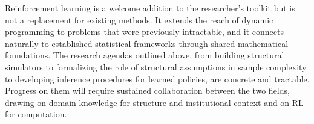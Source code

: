 Reinforcement learning is a welcome addition to the researcher's toolkit but is not a replacement for existing methods. It extends the reach of dynamic programming to problems that were previously intractable, and it connects naturally to established statistical frameworks through shared mathematical foundations. The research agendas outlined above, from building structural simulators to formalizing the role of structural assumptions in sample complexity to developing inference procedures for learned policies, are concrete and tractable. Progress on them will require sustained collaboration between the two fields, drawing on domain knowledge for structure and institutional context and on RL for computation.

